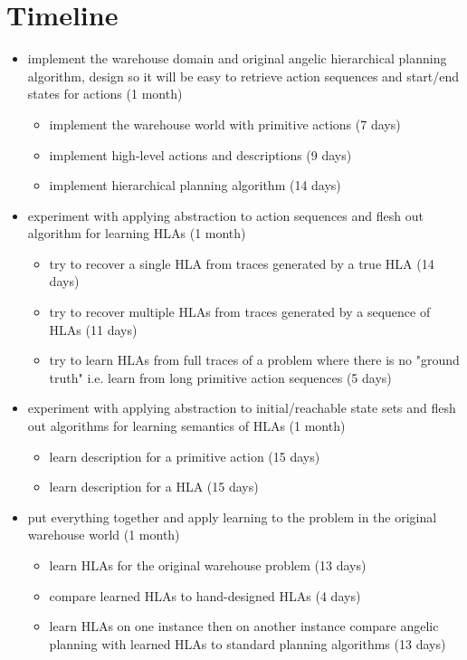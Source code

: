 \documentclass[a4paper,12pt]{article}
\begin{document}
\section{Timeline}
\begin{itemize}
\item implement the warehouse domain and original angelic hierarchical planning algorithm, design so it will be easy to retrieve action sequences and start/end states for actions (1 month)

\begin{itemize}
\item implement the warehouse world with primitive actions (7 days)
\item implement high-level actions and descriptions (9 days)
\item implement hierarchical planning algorithm (14 days)
\end{itemize}

\item experiment with applying abstraction to action sequences and flesh out algorithm for learning HLAs (1 month)
\begin{itemize}
\item try to recover a single HLA from traces generated by a true HLA (14 days)
\item try to recover multiple HLAs from traces generated by a sequence of HLAs (11 days)
\item try to learn HLAs from full traces of a problem where there is no "ground truth" i.e. learn from long primitive action sequences (5 days)
\end{itemize}

\item experiment with applying abstraction to initial/reachable state sets and flesh out algorithms for learning semantics of HLAs (1 month)
\begin{itemize}
\item learn description for a primitive action (15 days)
\item learn description for a HLA (15 days)
\end{itemize}

\item put everything together and apply learning to the problem in the original warehouse world (1 month)
\begin{itemize}
\item learn HLAs for the original warehouse problem (13 days)
\item compare learned HLAs to hand-designed HLAs (4 days)
\item learn HLAs on one instance then on another instance compare angelic planning with learned HLAs to standard planning algorithms (13 days)
\end{itemize}

\end{itemize}



\end{document}
